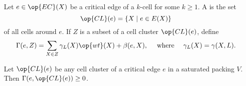 \begin{definition}\label{def:gammaL} 
Let $e\in \op{EC}(X)$ be a critical edge of a $k$-cell for some $k\ge 1$.
A  is the set 
\begin{displaymath} 
\op{CL}(e) = \{X\mid e\in E(X)\} 
\end{displaymath}
%
of all cells around $e$. 
If $Z$ is a subset of a cell cluster $\op{CL}(e)$, define
%
%
\begin{displaymath} 
\Gamma(e,Z) = \sum_{X\in Z} \gamma_L(X) \op{wt}(X) +\beta(e,X),\quad\hbox{ where }\quad
\gamma_L(X) = \gamma(X,L).
\end{displaymath}
%
%

\end{definition}
%

\begin{theorem} 
\label{lemma:cluster}
Let $\op{CL}(e)$ be any cell cluster of a critical edge $e$ in a saturated packing $V$.  
Then $\Gamma(e,\op{CL}(e))\ge 0$.
\end{theorem}

